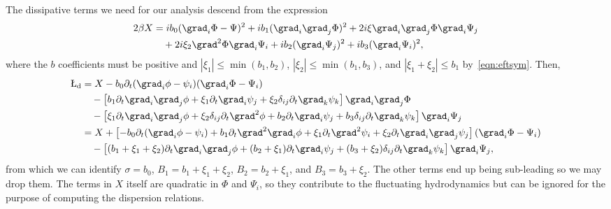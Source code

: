 The dissipative terms we need for our analysis descend from the expression
\begin{align}
2\beta X &= i b_0(\grad_i\Phi - \Psi)^2 + i b_1(\grad_i\grad_j\Phi)^2 + 2i\xi \grad_i\grad_j\Phi \grad_i\Psi_j \nonumber\\
&\quad + 2i\xi_2 \grad^2\Phi \grad_i\Psi_i + ib_2 (\grad_i\Psi_j)^2 + ib_3(\grad_i\Psi_i)^2,
\end{align}
where the $b$ coefficients must be positive and $|\xi_1| \le \min(b_1,b_2)$, $|\xi_2| \le \min(b_1,b_3)$, and $|\xi_1+\xi_2| \le b_1$ by~\eqref{eqn:eftsym}. Then,
\begin{align}
\L_\text{d} &= X - b_0\partial_t(\grad_i\phi - \psi_i)(\grad_i\Phi - \Psi_i) \nonumber\\
&\quad - \left[ b_1 \partial_t \grad_i\grad_j\phi + \xi_1\partial_t \grad_i\psi_j + \xi_2 \delta_{ij}\partial_t\grad_k\psi_k \right] \grad_i\grad_j \Phi \nonumber\\
&\quad -\left[ \xi_1\partial_t\grad_i\grad_j\phi + \xi_2\delta_{ij} \partial_t \grad^2\phi + b_2\partial_t\grad_i\psi_j + b_3\delta_{ij} \partial_t\grad_k\psi_k \right] \grad_i\Psi_j\nonumber\\
&= X + \left[ - b_0\partial_t(\grad_i\phi - \psi_i) + b_1\partial_t\grad^2\grad_i\phi + \xi_1\partial_t\grad^2\psi_i + \xi_2\partial_t\grad_i\grad_j\psi_j \right](\grad_i\Phi - \Psi_i) \nonumber\\
&\quad -\left[ (b_1+\xi_1+\xi_2) \partial_t\grad_i\grad_j\phi + (b_2+\xi_1) \partial_t\grad_i\psi_j + (b_3+\xi_2) \delta_{ij} \partial_t\grad_k\psi_k \right] \grad_i\Psi_j,
\end{align}
from which we can identify $\sigma=b_0$, $B_1 = b_1+\xi_1+\xi_2$, $B_2 = b_2+\xi_1$, and $B_3 = b_3+\xi_2$. The other terms end up being sub-leading so we may drop them. The terms in $X$ itself are quadratic in $\Phi$ and $\Psi_i$, so they contribute to the fluctuating hydrodynamics but can be ignored for the purpose of computing the dispersion relations.
